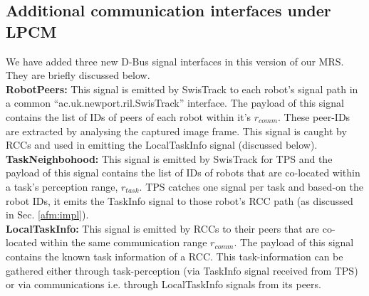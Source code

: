 \subsection*{Additional communication interfaces under LPCM}
We have added three new D-Bus signal interfaces in this version of our MRS. They are briefly discussed below.\\
\textbf{RobotPeers: }This signal is emitted by SwisTrack to each robot's signal path in a common ``ac.uk.newport.ril.SwisTrack'' interface. The payload of this signal contains the list of IDs of peers of each robot within it's $r_{comm}$.  These peer-IDs are extracted by analysing the captured image frame.  This signal is caught by RCCs and used in emitting the LocalTaskInfo signal (discussed below).\\
\textbf{TaskNeighbohood: }This signal is emitted by SwisTrack for TPS and the payload of this signal contains the list of IDs of robots that are co-located within a task's perception range, $r_{task}$. TPS catches one signal per task and based-on the robot IDs, it emits the TaskInfo signal to those robot's RCC path (as discussed in Sec. \ref{afm:impl}).\\ 
\textbf{LocalTaskInfo: }This signal is emitted by RCCs to their peers that are co-located within the same communication range $r_{comm}$. The payload of this signal contains the known task information of a  RCC. This task-information can be gathered either through task-perception (via TaskInfo signal received from TPS) or via communications i.e. through LocalTaskInfo signals from its peers.
